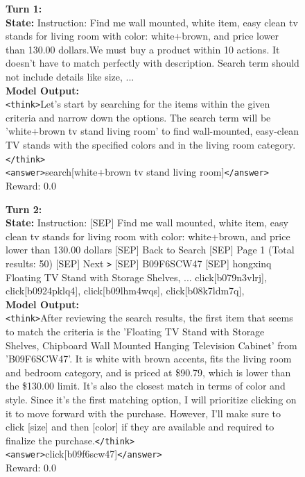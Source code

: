 \begin{figure}[t]
\small
\begin{tcolorbox}[colback=gray!2, colframe=black, boxrule=0.5pt, arc=2pt, width=0.95\linewidth, title=3B WebShop – Multi-Turn Rollout]
\textbf{Turn 1:} \\
\textbf{State:}
Instruction: Find me wall mounted, white item, easy clean tv stands for living room with color: white+brown, and price lower than 130.00 dollars.We must buy a product within 10 actions. It doesn't have to match perfectly with description.
Search term should not include details like size, ... \\
\textbf{Model Output:} \\
\texttt{<think>}Let's start by searching for the items within the given criteria and narrow down the options. The search term will be 'white+brown tv stand living room' to find wall-mounted, easy-clean TV stands with the specified colors and in the living room category.\texttt{</think>} \\
\texttt{<answer>}search[white+brown tv stand living room]\texttt{</answer>} \\
Reward: 0.0


\vspace{4pt}
\textbf{Turn 2:} \\
\textbf{State:}
Instruction: [SEP] Find me wall mounted, white item, easy clean tv stands for living room with color: white+brown, and price lower than 130.00 dollars [SEP] Back to Search [SEP] Page 1 (Total results: 50) [SEP] Next \texttt{>} [SEP] B09F6SCW47 [SEP] hongxinq Floating TV Stand with Storage Shelves, ... click[b079n3vlrj], click[b0924pklq4], click[b09lhm4wqs], click[b08k7ldm7q],\\
\textbf{Model Output:} \\
\texttt{<think>}After reviewing the search results, the first item that seems to match the criteria is the 'Floating TV Stand with Storage Shelves, Chipboard Wall Mounted Hanging Television Cabinet' from 'B09F6SCW47'. It is white with brown accents, fits the living room and bedroom category, and is priced at \$90.79, which is lower than the \$130.00 limit. It's also the closest match in terms of color and style. Since it's the first matching option, I will prioritize clicking on it to move forward with the purchase. However, I'll make sure to click [size] and then [color] if they are available and required to finalize the purchase.\texttt{</think>} \\
\texttt{<answer>}click[b09f6scw47]\texttt{</answer>} \\
Reward: 0.0



\end{tcolorbox}
\end{figure}
